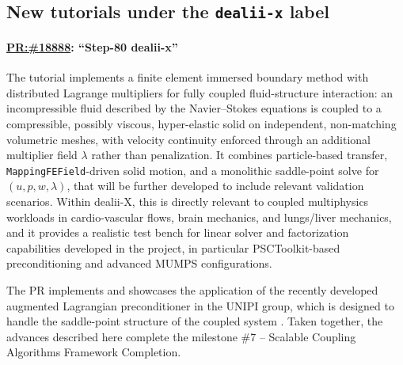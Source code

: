 \documentclass[a4paper,12pt]{article}
\newcommand{\pr}[1]{\href{https://github.com/dealii/dealii/pull/#1}{PR:\##1}}
\begin{document}
\subsection{New tutorials under the \texttt{dealii-x} label} \label{sec:dealii_x_tutorial}

\paragraph{\pr{18888}: ``Step-80 dealii-x''}

The tutorial implements a finite element immersed boundary method with
distributed Lagrange multipliers for fully coupled fluid-structure
interaction: an incompressible fluid described by the Navier--Stokes equations is coupled to a
compressible, possibly viscous, hyper-elastic solid on independent,
non-matching volumetric meshes, with velocity continuity enforced
through an additional multiplier field $\lambda$ rather than
penalization. It combines particle-based transfer,
\texttt{MappingFEField}-driven solid motion, and a monolithic
saddle-point solve for $(u,p,w,\lambda)$, that will be further
developed to include relevant validation scenarios. Within dealii-X,
this is directly relevant to coupled multiphysics workloads in
cardio-vascular flows, brain mechanics, and lungs/liver mechanics, and
it provides a realistic test bench for linear solver and factorization
capabilities developed in the project, in particular PSCToolkit-based
preconditioning and advanced MUMPS configurations. 

The PR implements and showcases the application of the recently
developed augmented Lagrangian preconditioner in the UNIPI group,
which is designed to handle the saddle-point structure of the coupled
system \citep{BenziFederHeltai-2026-a}. Taken together, the advances described here complete the milestone \#7 -- Scalable Coupling Algorithms Framework Completion.

\end{document}

